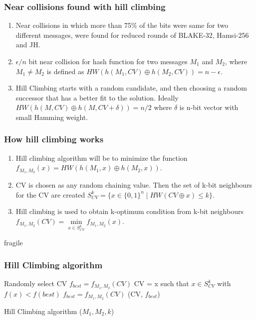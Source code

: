 \documentclass{beamer}
\begin{document}
\begin{frame}
\frametitle{Near collisions found with hill climbing}
\begin{enumerate}
\item Near collisions in which more than 75\% of the bits were same for two different messages, were found 
for reduced rounds of BLAKE-32, Hamsi-256 and JH.
\item $\epsilon / n $ bit near collision for hash function for two messages $M_{1}$ and $M_{2}$, where 
$M_{1} \neq M_{2}$ is defined as $HW( h( M_{1}, CV ) \oplus h( M_{2}, CV ) ) = n - \epsilon $.
\item Hill Climbing starts with a random candidate, and then choosing a random successor that has a better
fit to the solution. Ideally $HW( h(M, CV) \oplus h(M, CV + \delta) ) = n / 2 $ where $\delta$ is n-bit 
vector with small Hamming weight.
\end{enumerate}
\end{frame}

\begin{frame}
\frametitle{How hill climbing works}
\begin{enumerate}
\item Hill climbing algorithm will be to minimize the function 
$f_{M_{1}, M_{2}}(x) = HW( h(M_{1}, x) \oplus h(M_{2}, x) )$.
\item CV is chosen as any random chaining value. Then the set of k-bit neighbours for the CV are created
$S^{k}_{CV} = \{ x \in \{0, 1\}^{n} \mid HW( CV \oplus x ) \leq k \}$.
\item Hill climbing is used to obtain k-optimum condition from k-bit neighbours 
$f_{M_{1}, M_{2}} (CV) =  \min\limits_{x \in S^{k}_{CV}} f_{M_{1}, M_{2}} (x)$.
\end{enumerate}
\end{frame}

\begin{frame}{fragile}
\frametitle{Hill Climbing algorithm}
\begin{algorithm}[H]
  \begin{algorithmic}[1]
    \State Randomly select CV
    \State $f_{best} = f_{M_{1}, M_{2}}(CV)$
    \State {}
    \State CV = x such that $x \in S^{k}_{CV}$ with $f(x) < f(best)$
    \State $f_{best} = f_{M_{1}, M_{2}}(CV)$
    \State \EndWhile
    \State \Return (CV, $f_{best}$)
  \end{algorithmic}
  \caption{Hill Climbing algorithm ($M_{1}, M_{2}, k$)}
\end{algorithm}
\end{frame}
\end{document}
